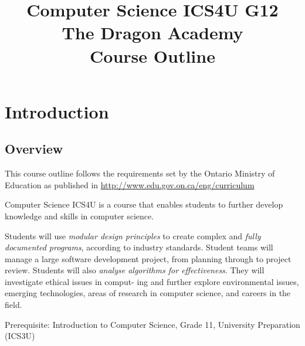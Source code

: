 \documentclass{report}
\date{\displaydate{date}}
\title{Computer Science ICS4U G12 \\
The Dragon Academy \\
Course Outline
}
\begin{document}
\maketitle
\tableofcontents
\chapter{Introduction}
\section{Overview}
This course outline follows the requirements set by the Ontario Ministry of Education as published 
in \href{http://www.edu.gov.on.ca/eng/curriculum/secondary/computer10to12_2008.pdf}{http://www.edu.gov.on.ca/eng/curriculum}

Computer Science ICS4U is a course that enables students to further develop knowledge and skills in computer
science. 

Students will use {\sl modular design principles} to create complex and {\sl fully documented programs}, 
according to industry standards. Student teams will manage a large
software development project, from planning through to project review. Students will
also {\sl analyse algorithms for effectiveness}. They will investigate ethical issues in comput-
ing and further explore environmental issues, emerging technologies, areas of research
in computer science, and careers in the field.

Prerequisite: Introduction to Computer Science, Grade 11, University Preparation (ICS3U)
\end{document}
